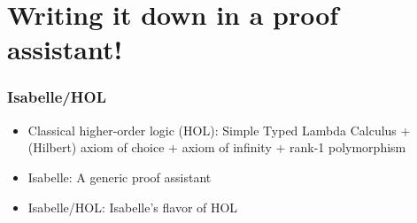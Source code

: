\documentclass[aspectratio=169,10pt]{beamer}
\begin{document}
\section{Writing it down in a proof assistant!}

\begin{frame}[fragile]
  \frametitle{Isabelle/HOL}
  \begin{itemize}
    \item Classical higher-order logic (HOL): Simple Typed Lambda Calculus + (Hilbert) axiom of choice + axiom of infinity + rank-1 polymorphism
          \pause
    \item Isabelle: A generic proof assistant
          \begin{overlayarea}{\textwidth}{.45\textheight}
            \centering
            \begin{figure}
              \centering
            \end{figure}
          \end{overlayarea}
    \item Isabelle/HOL: Isabelle's flavor of HOL
  \end{itemize}
\end{frame}
\end{document}
